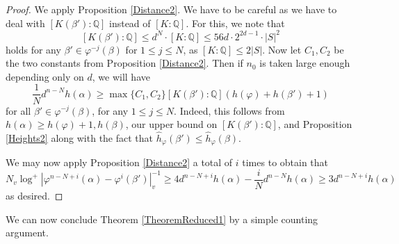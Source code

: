 \documentclass[10pt, reqno]{amsart}
\newcommand{\bb}{\mathbb}
\newcommand{\vphi}{\varphi}
\newcommand{\h}{\widehat{h}}
\numberwithin{theorem}{section}
\numberwithin{equation}{section}
\numberwithin{example}{section}
\numberwithin{definition}{section}
\begin{document}
\begin{proof}
We apply Proposition \ref{Distance2}. We have to be careful as we have to deal with $[K(\beta'):\bb{Q}]$ instead of $[K:\bb{Q}]$. For this, we note that $$[K(\beta'):\bb{Q}] \leq d^N \cdot [K:\bb{Q}] \leq 56d \cdot 2^{2d-1} \cdot |S|^2$$
holds for any $\beta' \in \vphi^{-j}(\beta)$ for $1 \leq j \leq N$, as $[K:\bb{Q}] \leq 2|S|$. Now let $C_1,C_2$ be the two constants from Proposition \ref{Distance2}. Then if $n_0$ is taken large enough depending only on $d$, we will have 
$$\frac{1}{N} d^{n-N}h(\alpha) \geq  \max\{C_1,C_2\} [K(\beta'):\bb{Q}](h(\vphi) + h(\beta')+1)$$
for all $\beta' \in \vphi^{-j}(\beta)$, for any $1 \leq j \leq N$. Indeed, this follows from $h(\alpha) \geq h(\vphi)+1, h(\beta)$, our upper bound on $[K(\beta'):\bb{Q}]$, and Proposition \ref{Heights2} along with the fact that $\h_{\vphi}(\beta') \leq \h_{\vphi}(\beta)$. 
\par 
We may now apply Proposition \ref{Distance2} a total of $i$ times to obtain that 
$$N_v \log^+|\vphi^{n-N+i}(\alpha) - \vphi^i(\beta')|_v^{-1} \geq 4d^{n-N+i} h(\alpha) - \frac{i}{N} d^{n-N} h(\alpha) \geq 3d^{n-N+i} h(\alpha)$$
as desired. 
\end{proof}


We can now conclude Theorem \ref{TheoremReduced1} by a simple counting argument. 
\end{document}
